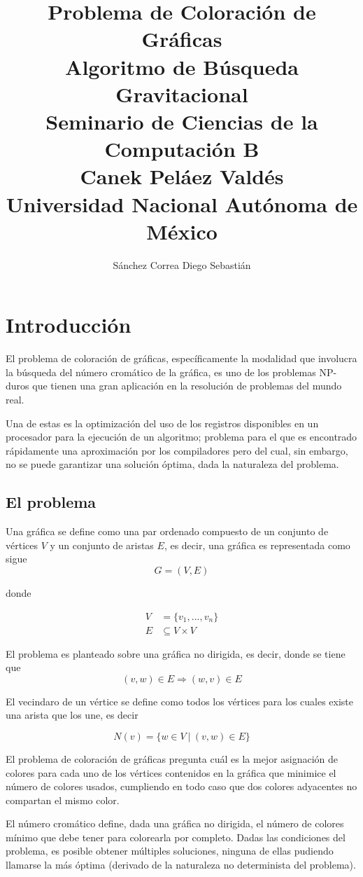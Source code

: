 \documentclass[a4paper]{report}
\title {\textbf {\Large{Problema de Coloraci\'on de Gr\'aficas}}\protect\\
  \large{\textbf{Algoritmo de B\'usqueda Gravitacional}}\protect\\ \vspace{0.4cm}
  \normalsize{\textbf{Seminario de Ciencias de la Computaci\'on B}} \protect\\ \vspace{0.2cm}
  \normalsize{Canek Pel\'aez Vald\'es} \protect\\ \vspace{0.4cm}
  \normalsize{Universidad Nacional Aut\'onoma de M\'exico}}
\date{}
\author{\normalsize Sánchez Correa Diego Sebastián}
\begin{document}
\allowdisplaybreaks
\maketitle

\chapter{Introducci\'on}
El problema de coloraci\'on de gr\'aficas, espec\'ificamente la modalidad que involucra
la b\'usqueda del n\'umero crom\'atico de la gr\'afica, es uno de los problemas NP-duros
que tienen una gran aplicaci\'on en la resoluci\'on de problemas del mundo real.

Una de estas es la optimizaci\'on del uso de los registros disponibles en un procesador
para la ejecuci\'on de un algoritmo; problema para el que es encontrado r\'apidamente
una aproximaci\'on por los compiladores pero del cual, sin embargo, no se puede garantizar
una soluci\'on \'optima, dada la naturaleza del problema.

\section{El problema}
Una gr\'afica se define como una par ordenado compuesto de un conjunto de v\'ertices $V$ y
un conjunto de aristas $E$, es decir, una gr\'afica es representada como sigue
\[G =  (V, E)\]

donde

\begin{align*}
  V &= \{v_1, ..., v_n\}\\
  E &\subseteq V \times V
\end{align*}

El problema es planteado sobre una gr\'afica no dirigida, es decir, donde se tiene que
\[(v, w) \in E \Rightarrow (w, v) \in E\]

El vecindaro de un v\'ertice se define como todos los v\'ertices para los cuales existe
una arista que los une, es decir

\[N(v) = \{w \in V \ | \ (v, w) \in E\}\]

El problema de coloraci\'on de gr\'aficas pregunta cu\'al es la mejor asignaci\'on de
colores para cada uno de los v\'ertices contenidos en la gr\'afica que minimice el
n\'umero de colores usados, cumpliendo en todo caso que dos colores adyacentes no
compartan el mismo color.

El n\'umero crom\'atico define, dada una gr\'afica no dirigida, el n\'umero de colores
m\'inimo que debe tener para colorearla por completo.
Dadas las condiciones del problema, es posible obtener m\'ultiples soluciones, ninguna
de ellas pudiendo llamarse la m\'as \'optima (derivado de la naturaleza no determinista
del problema).
\end{document}
